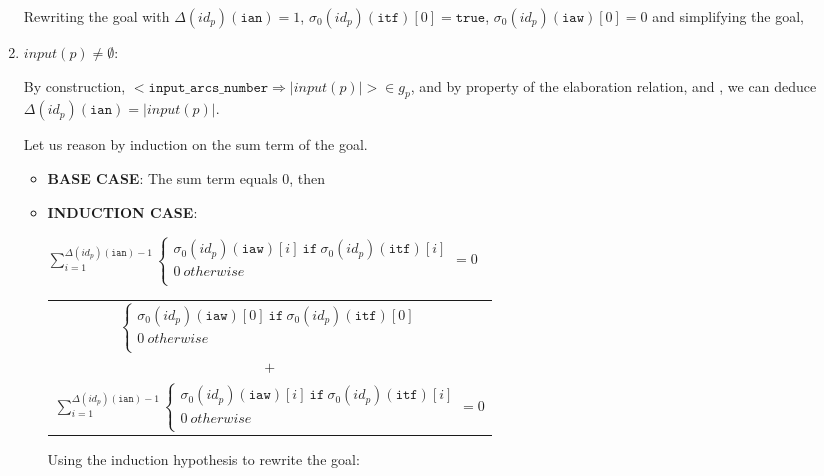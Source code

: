 \documentclass[dvipsnames,12pt]{article}
\begin{document}
\begin{niproof}
\begin{enumerate}
  Rewriting the goal with $\Delta(id_p)(\texttt{ian})=1$,
  $\sigma_0(id_p)(\texttt{itf})[0]=\mathtt{true}$,
  $\sigma_0(id_p)(\texttt{iaw})[0]=0$ and simplifying the goal,
  
\item $input(p)\neq\emptyset$:

  By construction,
  ${<}\texttt{input\_arcs\_number}\Rightarrow{}\vert{}input(p)\vert{>}\in{}g_p$,
  and by property of the elaboration relation, and \InCsCompP{}, we
  can deduce $\Delta(id_p)(\texttt{ian})=\vert{}input(p)\vert$.
  
  Let us reason by induction on the sum term of the goal.

  \begin{itemize}
  \item \textbf{BASE CASE}: The sum term equals 0, then 

  \item \textbf{INDUCTION CASE}:
    \begin{ih}
      $\sum\limits_{i=1}^{\Delta(id_p)(\texttt{ian})-1}\begin{cases}
        \sigma_0(id_p)(\texttt{iaw})[i]~\mathtt{if}~\sigma_0(id_p)(\texttt{itf})[i]\\
        0~otherwise \\
      \end{cases}=0$
    \end{ih}

    \begin{frameb}
      \begin{tabular}{c}
        $\begin{cases}
          \sigma_0(id_p)(\texttt{iaw})[0]~\mathtt{if}~\sigma_0(id_p)(\texttt{itf})[0]\\
          0~otherwise \\
        \end{cases}$ \\
        $+$ \\
        $\sum\limits_{i=1}^{\Delta(id_p)(\texttt{ian})-1}\begin{cases}
        \sigma_0(id_p)(\texttt{iaw})[i]~\mathtt{if}~\sigma_0(id_p)(\texttt{itf})[i]\\
        0~otherwise \\
      \end{cases}=0$
      \end{tabular}
    \end{frameb}

    Using the induction hypothesis to rewrite the goal:\\
    

\end{itemize}
\end{enumerate}
\end{niproof}
\end{document}
